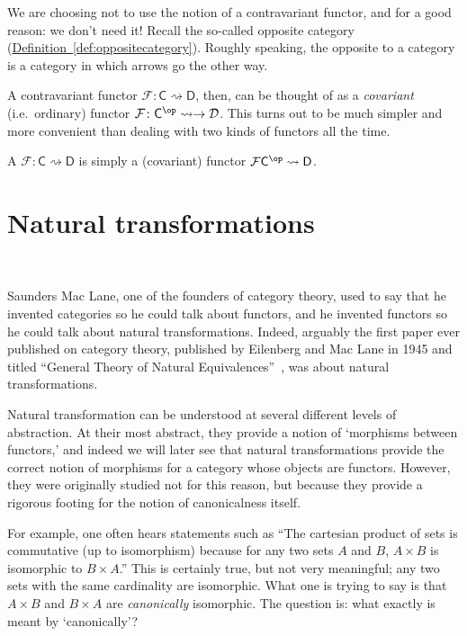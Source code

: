 \documentclass[main.tex]{subfiles}
\begin{document}
We are choosing not to use the notion of a contravariant functor, and for a good reason: we don't need it! Recall the so-called opposite category (\hyperref[def:oppositecategory]{Definition~\ref*{def:oppositecategory}}). Roughly speaking, the opposite to a category is a category in which arrows go the other way.

A contravariant functor $\mathcal{F}\colon \mathsf{C} \rightsquigarrow \mathsf{D}$, then, can be thought of as a \emph{covariant} (i.e.\ ordinary) functor $\mathcal{F}\colon \mathsf{C}^{\op} \rightsquigarrow \to \mathcal{D}$. This turns out to be much simpler and more convenient than dealing with two kinds of functors all the time.

\begin{definition}
  \label{def:contravariant_functor}
  A  $\mathcal{F}\colon \mathsf{C} \rightsquigarrow \mathsf{D}$ is simply a (covariant) functor $\mathcal{F}\mathsf{C}^{\op} \rightsquigarrow \mathsf{D}$.
\end{definition}


\section{Natural transformations}~\label{sec:naturaltransformations}

Saunders Mac Lane, one of the founders of category theory, used to say that he invented categories so he could talk about functors, and he invented functors so he could talk about natural transformations. Indeed, arguably the first paper ever published on category theory, published by Eilenberg and Mac Lane in 1945 and titled ``General Theory of Natural Equivalences''~\cite{awodey-intro-to-categories}, was about natural transformations.

Natural transformation can be understood at several different levels of abstraction. At their most abstract, they provide a notion of `morphisms between functors,' and indeed we will later see that natural transformations provide the correct notion of morphisms for a category whose objects are functors. However, they were originally studied not for this reason, but because they provide a rigorous footing for the notion of canonicalness itself.

For example, one often hears statements such as ``The cartesian product of sets is commutative (up to isomorphism) because for any two sets $A$ and $B$, $A \times B$ is isomorphic to $B \times A$.'' This is certainly true, but not very meaningful; any two sets with the same cardinality are isomorphic. What one is trying to say is that $A \times B$ and $B \times A$ are \emph{canonically} isomorphic. The question is: what exactly is meant by `canonically'?
\end{document}
